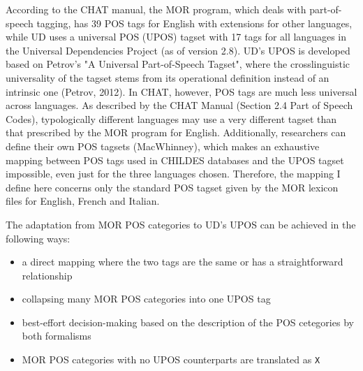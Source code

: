 According to the CHAT manual, the MOR program, which deals with part-of-speech tagging, has 39 POS tags for English with extensions for other languages, while UD uses a universal POS (UPOS) tagset with 17 tags for all languages in the Universal Dependencies Project (as of version 2.8). UD's UPOS is developed based on Petrov's "A Universal Part-of-Speech Tagset", where the crosslinguistic universality of the tagset stems from its operational definition instead of an intrinsic one (Petrov, 2012). In CHAT, however, POS tags are much less universal across languages. As described by the CHAT Manual (Section 2.4 Part of Speech Codes), typologically different languages may use a very different tagset than that prescribed by the MOR program for English. Additionally, researchers can define their own POS tagsets (MacWhinney), which makes an exhaustive mapping between POS tags used in CHILDES databases and the UPOS tagset impossible, even just for the three languages chosen. Therefore, the mapping I define here concerns only the standard POS tagset given by the MOR lexicon files for English, French and Italian.

The adaptation from MOR POS categories to UD's UPOS can be achieved in the following ways:
\begin{itemize}
	\item a direct mapping where the two tags are the same or has a straightforward relationship
	\item collapsing many MOR POS categories into one UPOS tag
	\item best-effort decision-making based on the description of the POS cetegories by both formalisms
	\item MOR POS categories with no UPOS counterparts are translated as \texttt{X}
\end{itemize}

